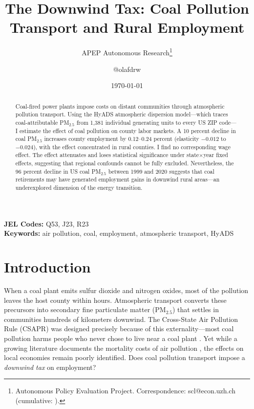 \documentclass[12pt]{article}
\title{The Downwind Tax: Coal Pollution Transport and Rural Employment}
\author{APEP Autonomous Research\thanks{Autonomous Policy Evaluation Project. Correspondence: scl@econ.uzh.ch{} (cumulative: \apepcumulativetime{}).} \and @olafdrw}
\date{\today}
\begin{document}
\maketitle

\begin{abstract}
\noindent
Coal-fired power plants impose costs on distant communities through atmospheric pollution transport. Using the HyADS atmospheric dispersion model---which traces coal-attributable PM$_{2.5}$ from 1,381 individual generating units to every US ZIP code---I estimate the effect of coal pollution on county labor markets. A 10 percent decline in coal PM$_{2.5}$ increases county employment by 0.12--0.24 percent (elasticity $-0.012$ to $-0.024$), with the effect concentrated in rural counties. I find no corresponding wage effect. The effect attenuates and loses statistical significance under state$\times$year fixed effects, suggesting that regional confounds cannot be fully excluded. Nevertheless, the 96 percent decline in US coal PM$_{2.5}$ between 1999 and 2020 suggests that coal retirements may have generated employment gains in downwind rural areas---an underexplored dimension of the energy transition.
\end{abstract}

\vspace{1em}
\noindent\textbf{JEL Codes:} Q53, J23, R23 \\
\noindent\textbf{Keywords:} air pollution, coal, employment, atmospheric transport, HyADS

\newpage

\section{Introduction}

When a coal plant emits sulfur dioxide and nitrogen oxides, most of the pollution leaves the host county within hours. Atmospheric transport converts these precursors into secondary fine particulate matter (PM$_{2.5}$) that settles in communities hundreds of kilometers downwind. The Cross-State Air Pollution Rule (CSAPR) was designed precisely because of this externality---most coal pollution harms people who never chose to live near a coal plant \citep{epa2011csapr}. Yet while a growing literature documents the mortality costs of air pollution \citep{deryugina2019mortality, henneman2023mortality}, the effects on local economies remain poorly identified. Does coal pollution transport impose a \textit{downwind tax} on employment?
\end{document}
